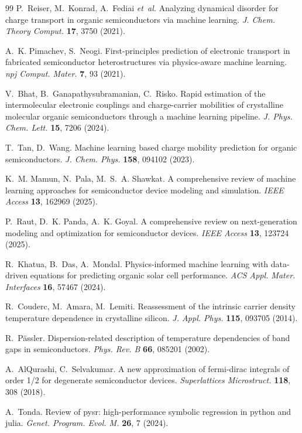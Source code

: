 \documentclass[fleqn,twoside,twocolumn,nofootinbib,showkeys]{revtex4} %
\begin{document}
\begin{thebibliography}{99}
P.~Reiser, M.~Konrad, A.~Fediai \textit{et~al.} Analyzing dynamical disorder for charge transport in organic semiconductors via machine learning. \textit{J. Chem. Theory Comput.} \textbf{17}, 3750 (2021).

A.~K. Pimachev, S.~Neogi. First-principles prediction of electronic transport in fabricated semiconductor heterostructures via physics-aware machine learning. \textit{npj Comput. Mater.} \textbf{7}, 93 (2021).

V.~Bhat, B.~Ganapathysubramanian, C.~Risko. Rapid estimation of the intermolecular electronic couplings and charge-carrier mobilities of crystalline molecular organic semiconductors through a machine learning pipeline. \textit{J. Phys. Chem. Lett.} \textbf{15}, 7206 (2024).

T.~Tan, D.~Wang. Machine learning based charge mobility prediction for organic semiconductors. \textit{J. Chem. Phys.} \textbf{158}, 094102 (2023).

K.~M. Mamun, N.~Pala, M.~S.~A. Shawkat. A comprehensive review of machine learning approaches for semiconductor device modeling and simulation. \textit{IEEE Access} \textbf{13}, 162969 (2025).

P.~Raut, D.~K. Panda, A.~K. Goyal. A comprehensive review on next-generation modeling and optimization for semiconductor devices. \textit{IEEE Access} \textbf{13}, 123724 (2025).

R.~Khatua, B.~Das, A.~Mondal. Physics-informed machine learning with data-driven equations for predicting organic solar cell performance. \textit{ACS Appl. Mater. Interfaces} \textbf{16}, 57467 (2024).

R.~Couderc, M.~Amara, M.~Lemiti. Reassessment of the intrinsic carrier density temperature dependence in crystalline silicon. \textit{J. Appl. Phys.} \textbf{115}, 093705 (2014).

R.~P\"assler. Dispersion-related description of temperature dependencies of band gaps in semiconductors. \textit{Phys. Rev. B} \textbf{66}, 085201 (2002).

A.~AlQurashi, C.~Selvakumar. A new approximation of fermi-dirac integrals of order 1/2 for degenerate semiconductor devices. \textit{Superlattices Microstruct.} \textbf{118}, 308 (2018).

A.~Tonda. Review of pysr: high-performance symbolic regression in python and julia. \textit{Genet. Program. Evol. M.} \textbf{26}, 7 (2024).


\end{thebibliography}
\end{document}
